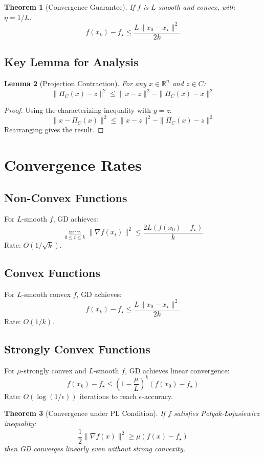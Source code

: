 \documentclass{article}
\newtheorem{theorem}{Theorem}
\newtheorem{lemma}[theorem]{Lemma}
\begin{document}
\begin{theorem}[Convergence Guarantee]
If \( f \) is \( L \)-smooth and convex, with \( \eta = 1/L \):
\[
f(x_k) - f_\star \leq \frac{L\|x_0 - x_\star\|^2}{2k}
\]
\end{theorem}

\subsection{Key Lemma for Analysis}
\begin{lemma}[Projection Contraction]
For any \( x \in \mathbb{R}^n \) and \( z \in C \):
\[
\|\Pi_C(x) - z\|^2 \leq \|x - z\|^2 - \|\Pi_C(x) - x\|^2
\]
\end{lemma}

\begin{proof}
Using the characterizing inequality with \( y = z \):
\[
\|x - \Pi_C(x)\|^2 \leq \|x - z\|^2 - \|\Pi_C(x) - z\|^2
\]
Rearranging gives the result.
\end{proof}

\section{Convergence Rates}
\subsection{Non-Convex Functions}
For \( L \)-smooth \( f \), GD achieves:
\[
\min_{0 \leq t \leq k} \|\nabla f(x_t)\|^2 \leq \frac{2L(f(x_0) - f_\star)}{k}
\]
Rate: \( O(1/\sqrt{k}) \).

\subsection{Convex Functions}
For \( L \)-smooth convex \( f \), GD achieves:
\[
f(x_k) - f_\star \leq \frac{L\|x_0 - x_\star\|^2}{2k}
\]
Rate: \( O(1/k) \).

\subsection{Strongly Convex Functions}
For \( \mu \)-strongly convex and \( L \)-smooth \( f \), GD achieves linear convergence:
\[
f(x_k) - f_\star \leq \left(1 - \frac{\mu}{L}\right)^k (f(x_0) - f_\star)
\]
Rate: \( O(\log(1/\epsilon)) \) iterations to reach \( \epsilon \)-accuracy.

\begin{theorem}[Convergence under PL Condition]
If \( f \) satisfies Polyak-Łojasiewicz inequality:
\[
\frac{1}{2}\|\nabla f(x)\|^2 \geq \mu(f(x) - f_\star)
\]
then GD converges linearly even without strong convexity.
\end{theorem}
\end{document}
